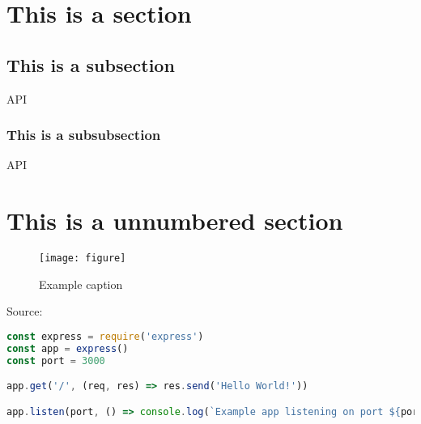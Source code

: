 
\section{This is a section}
\blindtext {}
\subsection{This is a subsection}
\blindtext \ac{API}
\subsubsection{This is a subsubsection}
\blindtext \ac{API}
\section*{This is a unnumbered section}
\begin{figure}[ht] 
    \centering
    \caption{Example caption}
    \texttt{[image: figure]} 
    \label{fig:goodreference}
    \end{figure}
\blindtext

\begin{subcaptionenv}{Source: }
    \begin{lstlisting}[caption={Express Example}, language=javascript]
const express = require('express')
const app = express()
const port = 3000

app.get('/', (req, res) => res.send('Hello World!'))

app.listen(port, () => console.log(`Example app listening on port ${port}!`))
        \end{lstlisting}
\end{subcaptionenv}